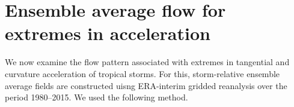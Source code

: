 \documentclass[wcd,manuscript]{copernicus}
\begin{document}




\section{Ensemble average flow for extremes in acceleration}

We now examine the flow pattern associated with extremes in tangential and curvature acceleration of tropical storms. For this, storm-relative ensemble average fields are constructed uisng ERA-interim gridded reanalysis over the period 1980--2015. We used the following method.
\end{document}
